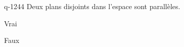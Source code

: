 \begin{truefalse}{q-1244}
Deux plans disjoints dans l'espace sont parallèles.
\item* Vrai
\item Faux
\end{truefalse}

